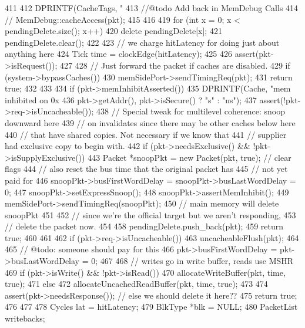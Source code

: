 \begin{DoxyCode}
411 {
412     DPRINTF(CacheTags, "%
413 //@todo Add back in MemDebug Calls
414 //    MemDebug::cacheAccess(pkt);
415 
416 
419     for (int x = 0; x < pendingDelete.size(); x++)
420         delete pendingDelete[x];
421     pendingDelete.clear();
422 
423     // we charge hitLatency for doing just about anything here
424     Tick time = clockEdge(hitLatency);
425 
426     assert(pkt->isRequest());
427 
428     // Just forward the packet if caches are disabled.
429     if (system->bypassCaches()) {
430         memSidePort->sendTimingReq(pkt);
431         return true;
432     }
433 
434     if (pkt->memInhibitAsserted()) {
435         DPRINTF(Cache, "mem inhibited on 0x%
436                 pkt->getAddr(), pkt->isSecure() ? "s" : "ns");
437         assert(!pkt->req->isUncacheable());
438         // Special tweak for multilevel coherence: snoop downward here
439         // on invalidates since there may be other caches below here
440         // that have shared copies.  Not necessary if we know that
441         // supplier had exclusive copy to begin with.
442         if (pkt->needsExclusive() && !pkt->isSupplyExclusive()) {
443             Packet *snoopPkt = new Packet(pkt, true);  // clear flags
444             // also reset the bus time that the original packet has
445             // not yet paid for
446             snoopPkt->busFirstWordDelay = snoopPkt->busLastWordDelay = 0;
447             snoopPkt->setExpressSnoop();
448             snoopPkt->assertMemInhibit();
449             memSidePort->sendTimingReq(snoopPkt);
450             // main memory will delete snoopPkt
451         }
452         // since we're the official target but we aren't responding,
453         // delete the packet now.
454 
458         pendingDelete.push_back(pkt);
459         return true;
460     }
461 
462     if (pkt->req->isUncacheable()) {
463         uncacheableFlush(pkt);
464 
465         // @todo: someone should pay for this
466         pkt->busFirstWordDelay = pkt->busLastWordDelay = 0;
467 
468         // writes go in write buffer, reads use MSHR
469         if (pkt->isWrite() && !pkt->isRead()) {
470             allocateWriteBuffer(pkt, time, true);
471         } else {
472             allocateUncachedReadBuffer(pkt, time, true);
473         }
474         assert(pkt->needsResponse()); // else we should delete it here??
475         return true;
476     }
477 
478     Cycles lat = hitLatency;
479     BlkType *blk = NULL;
480     PacketList writebacks;
}
\end{DoxyCode}
